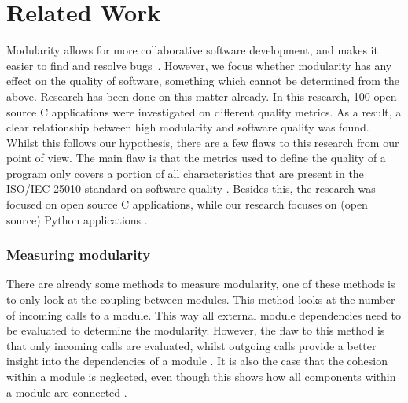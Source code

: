 \documentclass[twoside]{uva-inf-bachelor-thesis}
\begin{document}
\chapter{Related Work}
Modularity allows for more collaborative software development, and makes it easier to find and resolve bugs~\cite{LinuxKernel,lee2000linux}. However, we focus whether modularity has any effect on the quality of software, something which cannot be determined from the above. Research has been done on this matter already\cite{stamelos2002code}. In this research, 100 open source C applications were investigated on different quality metrics. As a result, a clear relationship between high modularity and software quality was found. Whilst this follows our hypothesis, there are a few flaws to this research from our point of view. The main flaw is that the metrics used to define the quality of a program only covers a portion of all characteristics that are present in the ISO/IEC 25010 standard on software quality\cite{ISO25010} . Besides this, the research was focused on open source C applications, while our research focuses on (open source) Python applications .

\subsection*{Measuring modularity}
There are already some methods to measure modularity, one of these methods is to only look at the coupling between modules\cite{BetterCodeHub,visser2016building}. This method looks at the number of incoming calls to a module. This way all external module dependencies need to be evaluated to determine the modularity. However, the flaw to this method is that only incoming calls are evaluated, whilst outgoing calls provide a better insight into the dependencies of a module . It is also the case that the cohesion within a module is neglected, even though this shows how all components within a module are connected .
\end{document}
